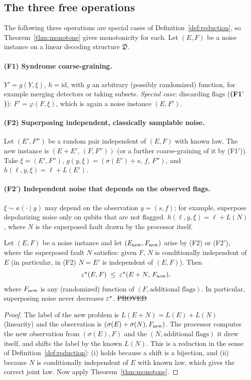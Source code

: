 \subsection{The three free operations}

The following three operations are special cases of Definition~\ref{def:reduction}, so Theorem~\ref{thm:monotone} gives monotonicity for each.
Let $(E,F)$ be a noise instance on a linear decoding structure $\mathfrak D$.

\paragraph{(F1) Syndrome coarse-graining.}
$Y'=g(Y,\xi)$, $h=\mathrm{id}$, with $g$ an arbitrary (possibly randomized) function, for example merging detectors or taking subsets.
\emph{Special case}: discarding flags (\textbf{(F1$'$)}): $F'=\varphi(F,\xi)$, which is again a noise instance $(E,F')$.

\paragraph{(F2) Superposing independent, classically samplable noise.}
Let $(E',F'')$ be a random pair independent of $(E,F)$ with known law. The new instance is
$(E+E',\,(F,F''))$ (or a further coarse-graining of it by (F1$'$)).
Take $\xi=(E',F'')$, $g(y,\xi)=(\sigma(E')+s,\,f,\,F'')$, and $h(\ell,y,\xi)=\ell+L(E')$.

\paragraph{(F2$'$) Independent noise that depends on the observed flags.}
$\xi\sim\kappa(\cdot\mid y)$ may depend on the observation $y=(s,f)$; for example, superpose depolarizing noise only on qubits that are not flagged.
$h(\ell,y,\xi)=\ell+L(N)$, where $N$ is the superposed fault drawn by the processor itself.

\begin{proposition}\label{prop:free-ops}
Let $(E,F)$ be a noise instance and let $(E_{\rm new},F_{\rm new})$ arise by (F2) or (F2$'$), where the superposed fault $N$ satisfies:
given $F$, $N$ is conditionally independent of $E$ (in particular, in (F2) $N=E'$ is independent of $(E,F)$). Then
\[
\varepsilon^{\star}(E,F)\;\le\;\varepsilon^{\star}(E+N,\,F_{\rm new}),
\]
where $F_{\rm new}$ is any (randomized) function of $(F,\text{additional flags})$. In particular, superposing noise never decreases $\varepsilon^{\star}$.
\hfill\st{PROVED}
\end{proposition}
\begin{proof}
The label of the new problem is $L(E+N)=L(E)+L(N)$ (linearity) and the observation is $(\sigma(E)+\sigma(N),F_{\rm new})$.
The processor computes the new observation from $(\sigma(E),F)$ and the $(N,\text{additional flags})$ it drew itself, and shifts the label by the known $L(N)$.
This is a reduction in the sense of Definition~\ref{def:reduction}: (i) holds because a shift is a bijection, and (ii) because $N$ is conditionally independent of $E$ with known law,
which gives the correct joint law. Now apply Theorem~\ref{thm:monotone}.
\end{proof}

